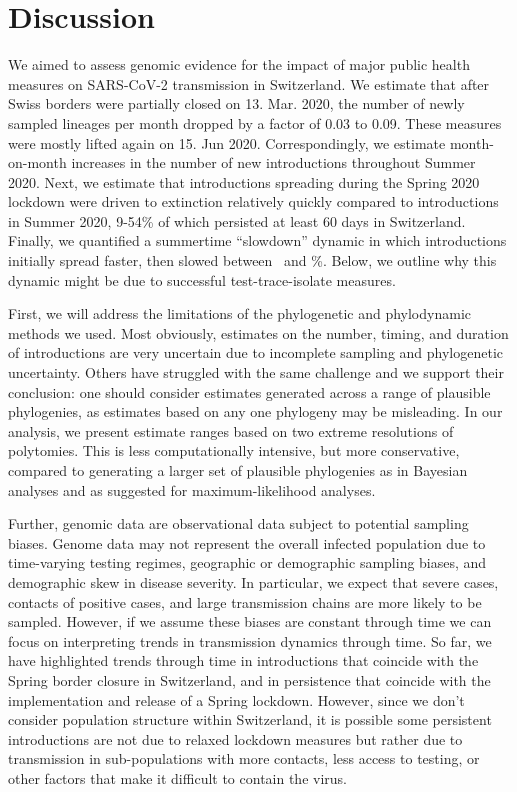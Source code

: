 \documentclass[9pt,twoside,lineno]{pnas-new} %
\begin{document}
\section{Discussion}
We aimed to assess genomic evidence for the impact of major public health measures on SARS-CoV-2 transmission in Switzerland. We estimate that after Swiss borders were partially closed on 13. Mar. 2020, the number of newly sampled lineages per month dropped by a factor of 0.03 to 0.09. These measures were mostly lifted again on 15. Jun 2020. Correspondingly, we estimate month-on-month increases in the number of new introductions throughout Summer 2020. Next, we estimate that introductions spreading during the Spring 2020 lockdown were driven to extinction relatively quickly compared to introductions in Summer 2020, 9-54\% of which persisted at least 60 days in Switzerland. Finally, we quantified a summertime ``slowdown'' dynamic in which introductions initially spread faster, then slowed between \summermaxdampingpercentmedianCHEnosampUB\ and \summermindampingpercentmedianCHEnosampUB \%. Below, we outline why this dynamic might be due to successful test-trace-isolate measures.

First, we will address the limitations of the phylogenetic and phylodynamic methods we used. Most obviously, estimates on the number, timing, and duration of introductions are very uncertain due to incomplete sampling and phylogenetic uncertainty. Others have struggled with the same challenge \cite{Morel2021} and we support their conclusion: one should consider estimates generated across a range of plausible phylogenies, as estimates based on any one phylogeny may be misleading. In our analysis, we present estimate ranges based on two extreme resolutions of polytomies. This is less computationally intensive, but more conservative, compared to generating a larger set of plausible phylogenies as in Bayesian analyses and as \cite{Morel2021} suggested for maximum-likelihood analyses.

Further, genomic data are observational data subject to potential sampling biases. Genome data may not represent the overall infected population due to time-varying testing regimes, geographic or demographic sampling biases, and demographic skew in disease severity. In particular, we expect that severe cases, contacts of positive cases, and large transmission chains are more likely to be sampled. However, if we assume these biases are constant through time we can focus on interpreting trends in transmission dynamics through time. So far, we have highlighted trends through time in introductions that coincide with the Spring border closure in Switzerland, and in persistence that coincide with the implementation and release of a Spring lockdown. However, since we don't consider population structure within Switzerland, it is possible some persistent introductions are not due to relaxed lockdown measures but rather due to transmission in sub-populations with more contacts, less access to testing, or other factors that make it difficult to contain the virus.
\end{document}
